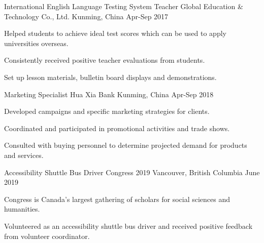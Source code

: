
\begin{cventries}
 \cventry
    {International English Language Testing System Teacher} %
    {Global Education \& Technology Co., Ltd.} %
    {Kunming, China} %
    {Apr-Sep 2017} %
    {
      \begin{cvitems} %
        \item {Helped students to achieve ideal test scores which can be used to apply universities overseas.}
        \item{Consistently received positive teacher evaluations from students.}
        \item{Set up lesson materials, bulletin board displays and demonstrations.}
      \end{cvitems}
    }
    
    
  \cventry
    {Marketing Specialist} %
    {Hua Xia Bank} %
    {Kunming, China} %
    {Apr-Sep 2018} %
    {
      \begin{cvitems} %
        \item {Developed campaigns and specific marketing strategies for clients.}
        \item{Coordinated and participated in promotional activities and trade shows.}
        \item{Consulted with buying personnel to determine projected demand for products and services.}
      \end{cvitems}
    }
    
   
    
    \cventry
    {Accessibility Shuttle Bus Driver} %
    {Congress 2019} %
    {Vancouver, British Columbia} %
    {June 2019} %
    {
      \begin{cvitems} %
        \item{Congress is Canada's largest gathering of scholars for social sciences and humanities.}
        \item {Volunteered as an accessibility shuttle bus driver and received positive feedback from volunteer coordinator. }
      \end{cvitems}
    }
    
    

 
\end{cventries}
